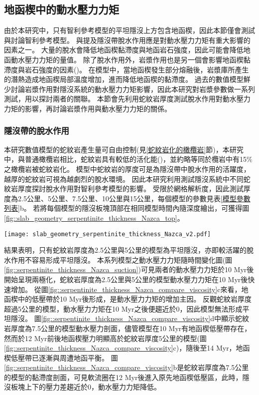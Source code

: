\newpage
\subsection{地函楔中的動水壓力力矩}
由於本研究中，只有智利參考模型的平坦隱沒上方包含地函楔，因此本節僅會測試與討論智利參考模型。
\citet{Manea2007}與\citet{Yan2020}提及隱沒帶脫水作用應是對動水壓力力矩有重大影響的因素之一。
大量的脫水會降低地函楔黏滯度與地函岩石強度，因此可能會降低地函動水壓力力矩的量值。
除了脫水作用外，岩漿作用也是另一個會影響地函楔黏滯度與岩石強度的因素(\citealp{jamieson2011crustal})。
在模型中，當地函楔發生部分熔融後，岩漿庫所產生的潛熱造成地函楔局部溫度增加，進而降低地函楔的黏滯度。
過去的數值模型鮮少討論岩漿作用對隱沒系統的動水壓力力矩影響，因此本研究對岩漿參數做一系列測試，用以探討兩者的關聯。
本節會先利用蛇紋岩厚度測試脫水作用對動水壓力力矩的影響，再討論岩漿作用與動水壓力力矩的關係。

\subsubsection{隱沒帶的脫水作用}
本研究數值模型的蛇紋岩產生量可自由控制(見\ref{蛇紋岩化的橄欖岩}節)，本研究中，與普通橄欖岩相比，蛇紋岩具有較低的活化能(\citealp{hilairet2007high})，並約略等同於欖岩中有15$\%$之橄欖岩被蛇紋岩化。
模型中蛇紋岩的厚度可是為隱沒帶中脫水作用的活躍度，越厚的蛇紋岩可視為越劇烈的脫水環境。
因此本研究利用測試隱沒系統中不同蛇紋岩厚度探討脫水作用對智利參考模型的影響。
受限於網格解析度，因此測試厚度為2.5公里、5公里、7.5公里、10公里與15公里，每個模型的參數見表\ref{模型參數列表}b。
若將每個模型的隱沒板塊頂部在相同模型時間內隨深度繪出，可獲得圖\ref{fig::slab_geometry_serpentinite_thickness_Nazca_top}。

\begin{figure*}[ht!]
    \centering
    \texttt{[image: slab\_geometry\_serpentinite\_thickness\_Nazca\_v2.pdf]}
    \caption[測試蛇紋岩厚度模型的隱沒板塊頂部剖面圖]{測試蛇紋岩厚度模型的隱沒板塊頂部剖面圖，使用5公里移動平均平滑離散化的網格。}
    \label{fig::slab_geometry_serpentinite_thickness_Nazca_top}
\end{figure*}

結果表明，只有蛇紋岩厚度為2.5公里與5公里的模型為平坦隱沒，亦即較活躍的脫水作用不容易形成平坦隱沒。
本系列模型之動水壓力力矩隨時間變化圖(圖\ref{fig::serpentinite_thickness_Nazca_suction})可見兩者的動水壓力力矩於10 Myr後開始呈現兩極化，蛇紋岩厚度為2.5公里與5公里的模型動水壓力力矩在10 Myr後快速增加。
從圖\ref{fig::serpentinite_thickness_Nazca_compare_viscosity}c來看，地函楔中的低壓帶於10 Myr後形成，是動水壓力力矩的增加主因。
反觀蛇紋岩厚度超過5公里的模型，動水壓力力矩在10 Myr之後便趨近於0，因此模型無法形成平坦隱沒。
圖\ref{fig::serpentinite_thickness_Nazca_compare_viscosity}d中顯示蛇紋岩厚度為7.5公里的模型動水壓力剖面，儘管模型在10 Myr有地函楔低壓帶存在，然而於12 Myr前後地函楔壓力明顯高於蛇紋岩厚度5公里的模型(圖\ref{fig::serpentinite_thickness_Nazca_compare_viscosity}c)，隨後至14 Myr，地函楔低壓帶已逐漸與周遭地函平衡。
圖\ref{fig::serpentinite_thickness_Nazca_compare_viscosity}b是蛇紋岩厚度為7.5公里的模型的黏滯度剖面，可見軟流圈在12 Myr後進入原先地函楔低壓區，此時，隱沒板塊上下的壓力差趨近於0，動水壓力力矩降低。

